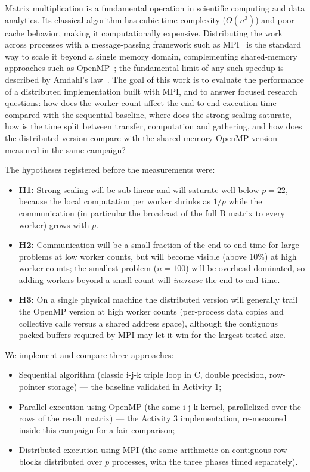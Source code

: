 \documentclass[12pt,a4paper]{article}
\begin{document}
Matrix multiplication is a fundamental operation in scientific computing and
data analytics. Its classical algorithm has cubic time complexity
($O(n^3)$) and poor cache behavior, making it computationally expensive.
Distributing the work across processes with a message-passing framework
such as MPI~\cite{mpi} is the standard way to scale it beyond a single
memory domain, complementing shared-memory approaches such as
OpenMP~\cite{openmp}; the fundamental limit of any such speedup is
described by Amdahl's law~\cite{amdahl}. The goal of this work is to
evaluate the performance of a distributed implementation built with MPI,
and to answer
focused research questions: how does the worker count affect the end-to-end
execution time compared with the sequential baseline, where does the strong
scaling saturate, how is the time split between transfer, computation and
gathering, and how does the distributed version compare with the
shared-memory OpenMP version measured in the same campaign?

The hypotheses registered before the measurements were:
\begin{itemize}
\item \textbf{H1:} Strong scaling will be sub-linear and will saturate well
below $p = 22$, because the local computation per worker shrinks as $1/p$
while the communication (in particular the broadcast of the full B matrix to
every worker) grows with $p$.
\item \textbf{H2:} Communication will be a small fraction of the end-to-end
time for large problems at low worker counts, but will become visible
(above 10\%) at high worker counts; the smallest problem
($n = 100$) will be overhead-dominated, so adding workers beyond a small
count will \emph{increase} the end-to-end time.
\item \textbf{H3:} On a single physical machine the distributed version will
generally trail the OpenMP version at high worker counts (per-process data
copies and collective calls versus a shared address space), although the
contiguous packed buffers required by MPI may let it win for the largest
tested size.
\end{itemize}

We implement and compare three approaches:
\begin{itemize}
\item Sequential algorithm (classic i-j-k triple loop in C, double
precision, row-pointer storage) --- the baseline validated in Activity 1;
\item Parallel execution using OpenMP (the same i-j-k kernel, parallelized
over the rows of the result matrix) --- the Activity 3 implementation,
re-measured inside this campaign for a fair comparison;
\item Distributed execution using MPI (the same arithmetic on contiguous
row blocks distributed over $p$ processes, with the three phases timed
separately).
\end{itemize}
\end{document}

